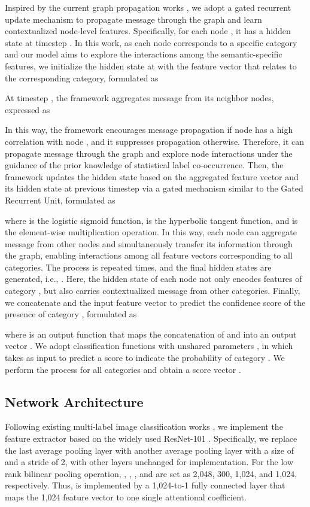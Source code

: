 \documentclass[10pt,twocolumn,letterpaper]{article}
\begin{document}
Inspired by the current graph propagation works \cite{li2015gated,chen2018knowledge,wang2018deep,chen2019knowledge}, we adopt a gated recurrent update mechanism to propagate message through the graph and learn contextualized node-level features. Specifically, for each node , it has a hidden state  at timestep . In this work, as each node corresponds to a specific category and our model aims to explore the interactions among the semantic-specific features, we initialize the hidden state at  with the feature vector that relates to the corresponding category, formulated as

At timestep , the framework aggregates message from its neighbor nodes, expressed as

In this way, the framework encourages message propagation if node  has a high correlation with node , and it suppresses propagation otherwise. Therefore, it can propagate message through the graph and explore node interactions under the guidance of the prior knowledge of statistical label co-occurrence. Then, the framework updates the hidden state based on the aggregated feature vector  and its hidden state at previous timestep  via a gated mechanism similar to the Gated Recurrent Unit, formulated as

where  is the logistic sigmoid function,  is the hyperbolic tangent function, and  is the element-wise multiplication operation. In this way, each node can aggregate message from other nodes and simultaneously transfer its information through the graph, enabling interactions among all feature vectors corresponding to all categories. The process is repeated  times, and the final hidden states are generated, i.e., . Here, the hidden state of each node  not only encodes features of category , but also carries contextualized message from other categories. Finally, we concatenate  and the input feature vector  to predict the confidence score of the presence of category , formulated as

where  is an output function that maps the concatenation of  and  into an output vector . We adopt  classification functions with unshared parameters , in which  takes  as input to predict a score to indicate the probability of category . We perform the process for all categories and obtain a score vector .

\subsection{Network Architecture}
Following existing multi-label image classification works \cite{zhu2017learning}, we implement the feature extractor  based on the widely used ResNet-101 \cite{he2016deep}. Specifically, we replace the last average pooling layer with another average pooling layer with a size of  and a stride of 2, with other layers unchanged for implementation. For the low rank bilinear pooling operation, , , , and  are set as 2,048, 300, 1,024, and 1,024, respectively. Thus,  is implemented by a 1,024-to-1 fully connected layer that maps the 1,024 feature vector to one single attentional coefficient.
\end{document}
